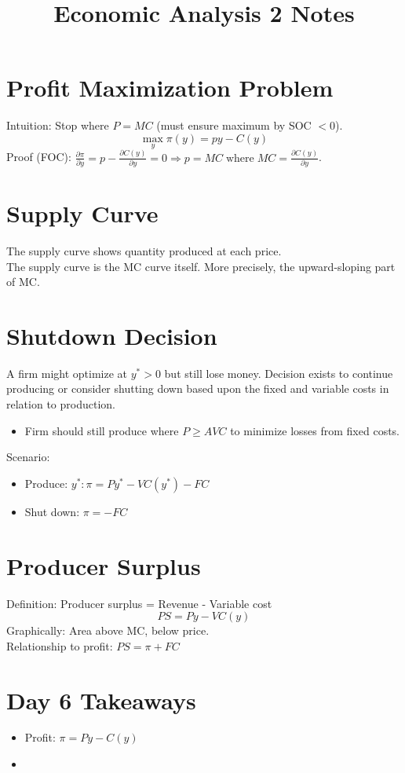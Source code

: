 \documentclass[11pt]{article}
\title{Economic Analysis 2 Notes}
\date{}
\begin{document}
\maketitle
\vspace{-1.5cm}

\section*{Profit Maximization Problem}
Intuition: Stop where $P=MC$ (must ensure maximum by SOC $<0$).
\[\max_{y}\pi(y)=py-C(y)\]
Proof (FOC): $\frac{\partial \pi}{\partial y}=p-\frac{\partial C(y)}{\partial y}=0\Rightarrow p =MC \; \text{where} \; MC=\frac{\partial C(y)}{\partial y}$.

\section*{Supply Curve}
The supply curve shows quantity produced at each price.\\
The supply curve is the MC curve itself. More precisely, the upward-sloping part of MC.

\section*{Shutdown Decision}
A firm might optimize at $y^*>0$ but still lose money. Decision exists to continue producing or consider shutting down based upon the fixed and variable costs in relation to production.
\begin{itemize}
    \item Firm should still produce where $P\geq AVC$ to minimize losses from fixed costs.
\end{itemize}
Scenario:
\begin{itemize}
    \item Produce: $y^*:\pi=Py^*-VC(y^*)-FC$
    \item Shut down: $\pi=-FC$
\end{itemize}
\section*{Producer Surplus}
Definition: Producer surplus = Revenue - Variable cost
\[ PS=Py-VC(y)\]
Graphically: Area above MC, below price.\\
Relationship to profit: $PS=\pi+FC$
\section*{Day 6 Takeaways}
\begin{itemize}
    \item Profit: $\pi=Py-C(y)$
    \item 
\end{itemize}
\end{document}
